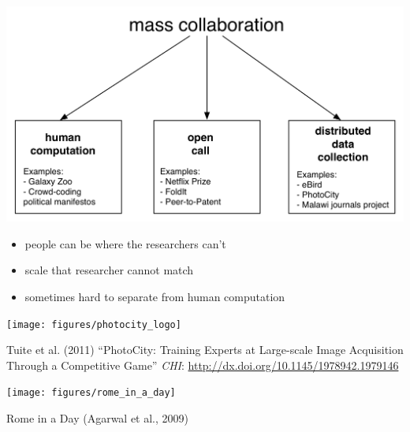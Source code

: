 \documentclass[aspectratio=169]{beamer}
\begin{document}
\begin{frame}

\begin{center}
\includegraphics[width=\textwidth]{figures/mass_collaboration_schematic}
\end{center}

\end{frame}
\begin{frame}

\begin{itemize}
\item people can be where the researchers can't
\pause
\item scale that researcher cannot match
\pause
\item sometimes hard to separate from human computation
\end{itemize}

\end{frame}
\begin{frame}

\begin{center}
\texttt{[image: figures/photocity\_logo]}
\end{center}

\small{
Tuite et al. (2011) ``PhotoCity: Training Experts at Large-scale Image Acquisition Through a Competitive Game'' \textit{CHI}:  \url{http://dx.doi.org/10.1145/1978942.1979146}
}

\end{frame}
\begin{frame}

\begin{center}
\texttt{[image: figures/rome\_in\_a\_day]}
\end{center}
Rome in a Day (Agarwal et al., 2009)

\end{frame}
\end{document}
